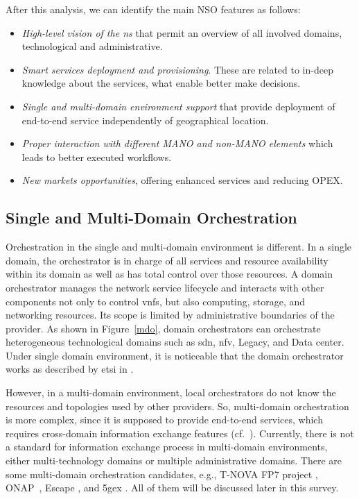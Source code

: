 After this analysis, we can identify the main NSO features as follows: 
\begin{itemize}
\item \textit{High-level vision of the \gls{ns}} that permit an overview of all involved domains, technological and administrative. 
\item \textit{Smart services deployment and provisioning}. These are related to in-deep knowledge about the services, what enable better make decisions. 
\item \textit{Single and multi-domain environment support} that provide deployment of end-to-end service independently of geographical location.
\item \textit{Proper interaction with different MANO and non-MANO elements} which leads to better executed workflows.
\item \textit{New markets opportunities}, offering enhanced services and reducing OPEX.    
\end{itemize}

\subsection{Single and Multi-Domain Orchestration}
\label{sec:domain}

Orchestration in the single and multi-domain environment is different. In a single domain, the orchestrator is in charge of all services and resource availability within its domain as well as has total control over those resources. A domain orchestrator manages the network service lifecycle and interacts with other components not only to control \glspl{vnf}, but also computing, storage, and networking resources. Its scope is limited by administrative boundaries of the provider. As shown in Figure~\ref{mdo}, domain orchestrators can orchestrate heterogeneous technological domains such as \gls{sdn}, \gls{nfv}, Legacy, and Data center. Under single domain environment, it is noticeable that the domain orchestrator works as described by \gls{etsi} in \cite{ETSIIndustrySpecificationGroupISGNFV2014NetworkOptions}. 

However, in a multi-domain environment,  local orchestrators do not know the resources and topologies used by other providers. So, multi-domain orchestration is more complex, since it is supposed to provide end-to-end services, which requires cross-domain information exchange features (cf.~\cite{md2}).  
Currently, there is not a standard for information exchange process in multi-domain environments, either multi-technology domains or multiple administrative domains. There are some multi-domain orchestration candidates, e.g., T-NOVA FP7 project \cite{FP7projectT-NOVAT-NOVAInfrastructures}, ONAP~\cite{onap}, Escape \cite{Sonkoly2015Multi-DomainClouds}, and \gls{5gex} \cite{Bernardos20155GInfrastructures}. All of them will be discussed later in this survey.


